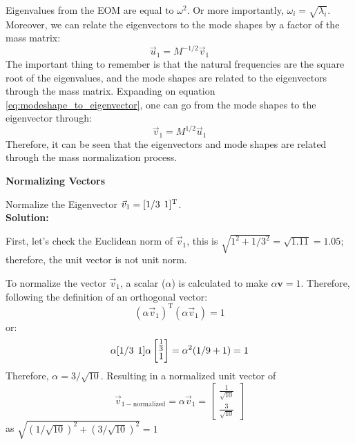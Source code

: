 \documentclass[12pt,letter]{article}
\begin{document}
Eigenvalues from the EOM are equal to $\omega^2$. Or more importantly, $\omega_i = \sqrt{\lambda_i}$. 
Moreover, we can relate the eigenvectors to the mode shapes by a factor of the mass matrix:
\begin{equation}
\vec{u}_1 = M^{-1/2}\vec{v}_1
\label{eq:modeshape_to_eigenvector}
\end{equation}
The important thing to remember is that the natural frequencies are the square root of the eigenvalues, and the mode shapes are related to the eigenvectors through the mass matrix. Expanding on equation \ref{eq:modeshape_to_eigenvector}, one can go from the mode shapes to the eigenvector through:
\begin{equation}
\vec{v}_1 = M^{1/2}\vec{u}_1
\end{equation}
Therefore, it can be seen that the eigenvectors and mode shapes are related through the mass normalization process. 
 

\begin{example}
	\label{ex:vector_normalizeation}
	
	\textbf{Normalizing Vectors}
	
	\noindent Normalize the Eigenvector $\vec{v}_1=[1/3 \hspace{1ex} 1]^\text{T}$. \\
	
	\noindent \textbf{Solution:} 
	
	\noindent First, let's check the Euclidean norm of $\vec{v}_1$, this is $\sqrt{1^2+1/3^2} = \sqrt{1.11} = 1.05$; therefore, the unit vector is not unit norm.
	
	To normalize the vector $\vec{v}_1$, a scalar ($\alpha$) is calculated to make $\alpha\textbf{v}=1$.  Therefore, following the definition of an orthogonal vector:
	\begin{equation}
		(\alpha \vec{v}_1)^\text{T}(\alpha \vec{v}_1) = 1
	\end{equation}
	or:
	\begin{equation}
		\alpha [1/3 \hspace{1ex} 1]\alpha  \begin{bmatrix} \frac{1}{3}\\  1 \end{bmatrix}  = \alpha^2(1/9+1) = 1
	\end{equation}
	Therefore, $\alpha=3/\sqrt{10}$. Resulting in a normalized unit vector of
	\begin{equation}
		\vec{v}_{1-\text{normalized}} = \alpha\vec{v}_1= \begin{bmatrix} \frac{1}{\sqrt{10}}\\  \frac{3}{\sqrt{10}} \end{bmatrix}
	\end{equation}
	as $\sqrt{(1/\sqrt{10})^2 + (3/\sqrt{10})^2} =1$
	
\end{example} 
\end{document}
